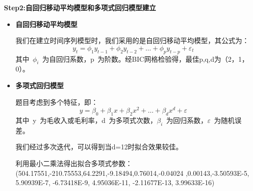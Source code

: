 \documentclass[withoutpreface,bwprint]{cumcmthesis}
\begin{document}
\textbf{Step2:自回归移动平均模型和多项式回归模型建立}
\par 
\begin{itemize}
    \item \textbf{自回归移动平均模型}
    \par
    我们在建立时间序列模型时，我们采用的是自回归移动平均模型，其公式为：
    \begin{equation}
        y_t = \phi_1y_{t-1} + \phi_2y_{t-2} + \dots + \phi_py_{t-p} + \varepsilon_t
    \end{equation}
    其中 \(\phi_i\) 为自回归系数，p 为阶数。经BIC网格检验得，最佳p,q,d为（2，1，0）。
    \par
    \item \textbf{多项式回归模型}
    \par
    题目考虑到多个特征，即：
    \begin{equation}
    y = \beta_0 + \beta_1x + \beta_2x^2 + \dots + \beta_dx^d + \varepsilon
   \end{equation} 
     其中 y 为毛收入或毛利率，d 为多项式次数，\(\beta_i\) 为回归系数，\(\varepsilon\) 为随机误差。
    \par
    我们经过多次迭代，可以得到当d=12时拟合效果较佳。
    \par
    利用最小二乘法得出拟合多项式参数：(504.17551,-210.75553,64.2291,-9.18494,0.76014,-0.04024
,0.00143,-3.50593E-5,
5.90939E-7,
-6.73418E-9,
4.95036E-11,
-2.11677E-13,
3.99633E-16)

\end{itemize}
\end{document}

